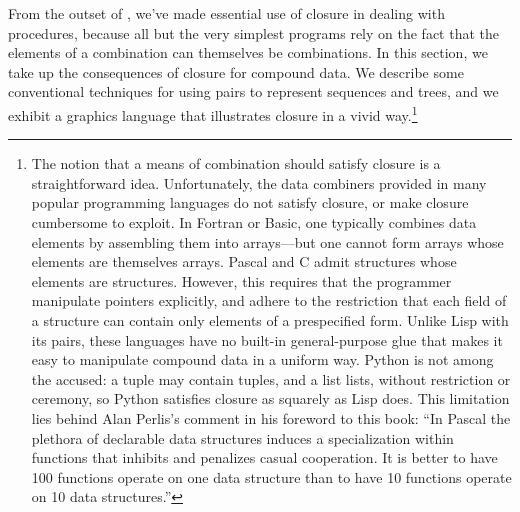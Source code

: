 From the outset of , we've made essential use of closure in
dealing with procedures, because all but the very simplest programs rely on the
fact that the elements of a combination can themselves be combinations.  In
this section, we take up the consequences of closure for compound data.  We
describe some conventional techniques for using pairs to represent sequences
and trees, and we exhibit a graphics language that illustrates closure in a
vivid way.\footnote{The notion that a means of combination should satisfy
closure is a straightforward idea.  Unfortunately, the data combiners provided
in many popular programming languages do not satisfy closure, or make closure
cumbersome to exploit.  In Fortran or Basic, one typically combines data
elements by assembling them into arrays---but one cannot form arrays whose
elements are themselves arrays.  Pascal and C admit structures whose elements
are structures.  However, this requires that the programmer manipulate pointers
explicitly, and adhere to the restriction that each field of a structure can
contain only elements of a prespecified form.  Unlike Lisp with its pairs,
these languages have no built-in general-purpose glue that makes it easy to
manipulate compound data in a uniform way.  Python is not among the accused: a
tuple may contain tuples, and a list lists, without restriction or ceremony, so
Python satisfies closure as squarely as Lisp does.  This limitation lies behind Alan
Perlis's comment in his foreword to this book: ``In Pascal the plethora of
declarable data structures induces a specialization within functions that
inhibits and penalizes casual cooperation.  It is better to have 100 functions
operate on one data structure than to have 10 functions operate on 10 data
structures.''}



